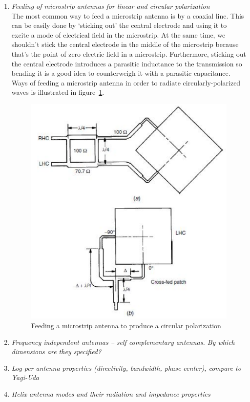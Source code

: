 \documentclass[11pt,a4paper]{article}
\begin{document}
\begin{enumerate}
    \item \emph{Feeding of microstrip antennas for linear and circular polarization}\\
    The most common way to feed a microstrip antenna is by a coaxial line. This can be easily done by `sticking out' the central electrode and using it to excite a mode of electrical field in the microstrip. At the same time, we shouldn't stick the central electrode in the middle of the microstrip because that's the point of zero electric field in a microstrip. Furthermore, sticking out the central electrode introduces a parasitic inductance to the transmission so bending it is a good idea to counterweigh it with a parasitic capacitance.\\
    Ways of feeding a microstrip antenna in order to radiate circularly-polarized waves is illustrated in figure~\ref{fig:patch-antenna-circular-polarization}.
    \begin{figure}[!ht]
        \centering
        \includegraphics[width=.6\textwidth]{src/patch-antenna-circular-polarization.png}
        \caption{\label{fig:patch-antenna-circular-polarization}Feeding a microstrip antenna to produce a circular polarization}
    \end{figure}
    
    \item \emph{Frequency independent antennas -- self complementary antennas. By which dimensions are they specified?}
    
    \item \emph{Log-per antenna properties (directivity, bandwidth, phase center), compare to Yagi-Uda}
    
    \item \emph{Helix antenna modes and their radiation and impedance properties}
    
\end{enumerate}
\end{document}
